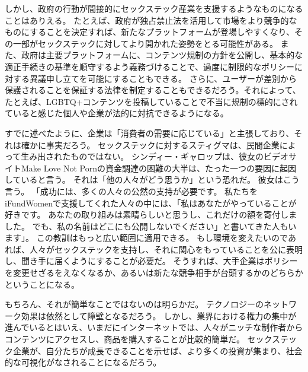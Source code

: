 \documentclass[paper=a4,book,openany]{jlreq}
\begin{document}
しかし、政府の行動が間接的にセックステック産業を支援するようなものになることはありえる。
たとえば、政府が独占禁止法を活用して市場をより競争的なものにすることを決定すれば、新たなプラットフォームが登場しやすくなり、その一部がセックステックに対してより開かれた姿勢をとる可能性がある。
また、政府は主要プラットフォームに、コンテンツ規制の方針を公開し、基本的な適正手続きの基準を順守するよう義務づけることで、過度に制限的なポリシーに対する異議申し立てを可能にすることもできる。
さらに、ユーザーが差別から保護されることを保証する法律を制定することもできるだろう。それによって、たとえば、LGBTQ+コンテンツを投稿していることで不当に規制の標的にされていると感じた個人や企業が法的に対抗できるようになる。

すでに述べたように、企業は「消費者の需要に応じている」と主張しており、それは確かに事実だろう。
セックステックに対するスティグマは、民間企業によって生み出されたものではない。
シンディー・ギャロップは、彼女のビデオサイトMake Love Not Pornの資金調達の困難の大半は、たった一つの要因に起因していると言う。
それは「他の人々がどう思うか」という恐れだ。
彼女はこう言う。
「成功には、多くの人々の公然の支持が必要です。
私たちをiFundWomenで支援してくれた人々の中には、「私はあなたがやっていることが好きです。
あなたの取り組みは素晴らしいと思うし、これだけの額を寄付しました。
でも、私の名前はどこにも公開しないでください」と書いてきた人もいます」\citep{manning17:_sextec_revol_will_not_be_crowd}。
この教訓はもっと広い範囲に適用できる。
もし環境を変えたいのであれば、人々がセックステックを支持し、それに関心をもっていることを公に表明し、聞き手に届くようにすることが必要だ。
そうすれば、大手企業はポリシーを変更せざるをえなくなるか、あるいは新たな競争相手が台頭するかのどちらかということになる。

もちろん、それが簡単なことではないのは明らかだ。
テクノロジーのネットワーク効果は依然として障壁となるだろう。
しかし、業界における権力の集中が進んでいるとはいえ、いまだにインターネットでは、人々がニッチな制作者からコンテンツにアクセスし、商品を購入することが比較的簡単だ。
セックステック企業が、自分たちが成長できることを示せば、より多くの投資が集まり、社会的な可視化がなされることになるだろう。
\end{document}
